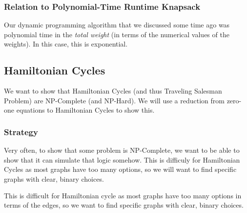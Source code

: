\documentclass[letterpaper]{article}
\begin{document}
\subsubsection{Relation to Polynomial-Time Runtime Knapsack}
Our dynamic programming algorithm that we discussed some time ago was polynomial time in the \emph{total weight} (in terms of the numerical values of the weights). In this case, this is exponential. 


\subsection{Hamiltonian Cycles}
We want to show that Hamiltonian Cycles (and thus Traveling Salesman Problem) are NP-Complete (and NP-Hard). We will use a reduction from zero-one equations to Hamiltonian Cycles to show this. 

\subsubsection{Strategy}
Very often, to show that some problem is NP-Complete, we want to be able to show that it can simulate that logic somehow. This is difficuly for Hamiltonian Cycles as most graphs have too many options, so we will want to find specific graphs with clear, binary choices. 

\bigskip 

This is difficult for Hamiltonian cycle as most graphs have too many options in terms of the edges, so we want to find specific graphs with clear, binary choices. 

\bigskip 
\end{document}
